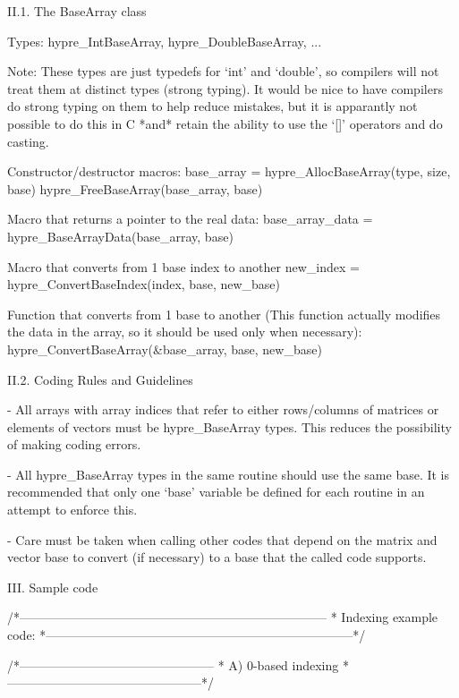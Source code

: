 II.1. The BaseArray class

Types:
  hypre_IntBaseArray, hypre_DoubleBaseArray, ...

  Note: These types are just typedefs for `int' and `double', so
  compilers will not treat them at distinct types (strong typing).
  It would be nice to have compilers do strong typing on them
  to help reduce mistakes, but it is apparantly not possible to
  do this in C *and* retain the ability to use the `[]' operators
  and do casting.

Constructor/destructor macros:
  base_array = hypre_AllocBaseArray(type, size, base)
  hypre_FreeBaseArray(base_array, base)

Macro that returns a pointer to the real data:
  base_array_data = hypre_BaseArrayData(base_array, base)

Macro that converts from 1 base index to another
  new_index = hypre_ConvertBaseIndex(index, base, new_base)

Function that converts from 1 base to another (This function actually
modifies the data in the array, so it should be used only when necessary):
  hypre_ConvertBaseArray(&base_array, base, new_base)

II.2. Coding Rules and Guidelines

- All arrays with array indices that refer to either rows/columns of
  matrices or elements of vectors must be hypre_BaseArray types.
  This reduces the possibility of making coding errors.

- All hypre_BaseArray types in the same routine should use the same base.
  It is recommended that only one `base' variable be defined for each
  routine in an attempt to enforce this.

- Care must be taken when calling other codes that depend on the matrix
  and vector base to convert (if necessary) to a base that the called
  code supports.


III. Sample code

/*--------------------------------------------------------------------------
 * Indexing example code:
 *--------------------------------------------------------------------------*/

/*-----------------------------------------------
 * A) 0-based indexing
 *-----------------------------------------------*/

